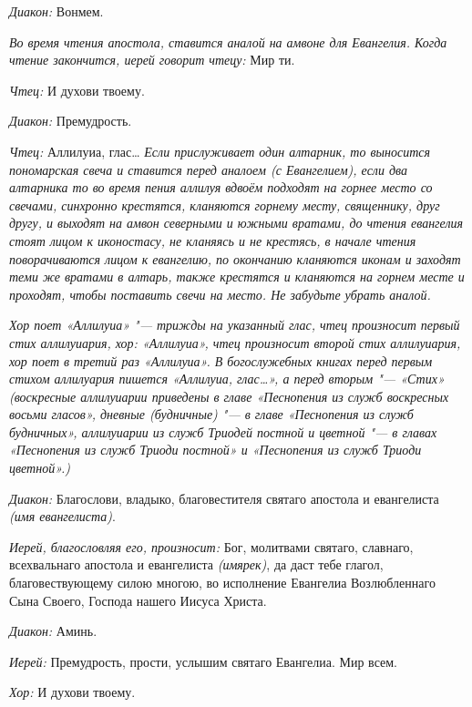 \begin{mymulticols}
{\itshape Диакон:} Вонмем.


{\itshape Во время чтения апостола, ставится аналой на амвоне для Евангелия. Когда чтение закончится, иерей говорит чтецу:} Мир ти.

{\itshape Чтец:} И духови твоему.


{\itshape Диакон:} Премудрость.

{\itshape Чтец:} Аллилуиа, глас… {\itshape Если прислуживает один алтарник, то выносится пономарская свеча и ставится перед аналоем (с Евангелием), если два алтарника то во время пения аллилуя вдвоём подходят на горнее место со свечами, синхронно крестятся, кланяются горнему месту, священнику, друг другу, и выходят на амвон северными и южными вратами, до чтения евангелия стоят лицом к иконостасу, не кланяясь и не крестясь, в начале чтения поворачиваются лицом к евангелию, по окончанию кланяются иконам и заходят теми же вратами в алтарь, также крестятся и кланяются на горнем месте и проходят, чтобы поставить свечи на место. Не забудьте убрать аналой.}

{\itshape Хор поет «Аллилуиа» "--- трижды на указанный глас, чтец произносит первый стих аллилуиария, хор: «Аллилуиа», чтец произносит второй стих аллилуиария, хор поет в третий раз «Аллилуиа». В богослужебных книгах перед первым стихом аллилуария пишется «Аллилуиа, глас…», а перед вторым "--- «Стих» (воскресные аллилуиарии приведены в главе «Песнопения из служб воскресных восьми гласов», дневные (будничные) "--- в главе «Песнопения из служб будничных», аллилуиарии из служб Триодей постной и цветной "--- в главах «Песнопения из служб Триоди постной» и «Песнопения из служб Триоди цветной».) }

{\itshape Диакон:} Благослови, владыко, благовестителя святаго апостола и евангелиста {\itshape (имя евангелиста)}.

{\itshape Иерей, благословляя его, произносит:} Бог, молитвами святаго, славнаго, всехвальнаго апостола и евангелиста {\itshape (имярек)}, да даст тебе глагол, благовествующему силою многою, во исполнение Евангелиа Возлюбленнаго Сына Своего, Господа нашего Иисуса Христа.

{\itshape Диакон:} Аминь.

{\itshape Иерей:} Премудрость, прости, услышим святаго Евангелиа. Мир всем.

{\itshape Хор:} И духови твоему.


\end{mymulticols}
